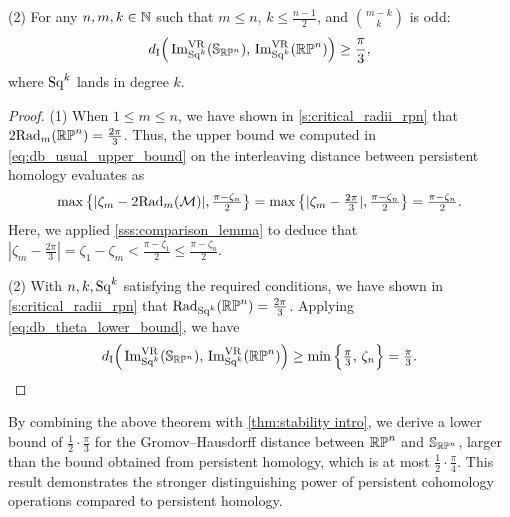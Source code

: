 \noindent (2) For any \(n,m,k \in \mathbb{N}\) such that \(m \leq n\), \(k \leq \tfrac{n-1}{2}\), and \(\binom{m-k}{k}\) is odd:
\[
d_{\mathrm{I}}\Big(\operatorname{Im}_{\mathrm{Sq}^k}^{\mathrm{VR}}(\mathbb{S}_{\mathbb{RP}^n}),\, \operatorname{Im}_{\mathrm{Sq}^k}^{\mathrm{VR}}(\mathbb{RP}^n)\Big) \geq \frac{\pi}{3},
\]
where $\mathrm{Sq}^k$ lands in degree \(k\).

\begin{proof}
	(1) When $1 \leq m \leq n$, we have shown in \cref{s:critical_radii_rpn} that
	$2\mathrm{Rad}_{m}(\mathbb{RP}^n) = \tfrac{2\pi}{3}$.
	Thus, the upper bound we computed in \cref{eq:db_usual_upper_bound} on the interleaving distance between persistent homology evaluates as
	\[\max\big\{|\zeta_m - 2\mathrm{Rad}_{m}(\mathcal{M}) |, \tfrac{\pi - \zeta_n}{2}\big\} =
	\max \big\{ |\zeta_m - \tfrac{2\pi}{3} |, \tfrac{\pi - \zeta_n}{2} \big\}
	= \tfrac{\pi - \zeta_n}{2}.
	\]
	Here, we applied \cref{sss:comparison_lemma} to deduce that $|\zeta_m - \tfrac{2\pi}{3} | = \zeta_1 - \zeta_m < \tfrac{\pi - \zeta_1}{2} \leq \tfrac{\pi - \zeta_n}{2}$.

	(2) With $n,k,\mathrm{Sq}^k$ satisfying the required conditions, we have shown in \cref{s:critical_radii_rpn} that
	$\mathrm{Rad}_{\mathrm{Sq}^k}(\mathbb{RP}^n) = \tfrac{2\pi}{3}$.
	Applying \cref{eq:db_theta_lower_bound}, we have
	\[d_{\mathrm{I}}\Big(\operatorname{Im}_{\mathrm{Sq}^k}^{\mathrm{VR}}(\mathbb{S}_{\mathbb{RP}^n}),\, \operatorname{Im}_{\mathrm{Sq}^k}^{\mathrm{VR}}(\mathbb{RP}^n)\Big)
	\geq \min\Big\{\tfrac{\pi}{3},\, \zeta_n\Big\}
	= \tfrac{\pi}{3}.\qedhere
	\]
\end{proof}

By combining the above theorem with \cref{thm:stability intro}, we derive a lower bound of \(\frac{1}{2} \cdot \frac{\pi}{3}\) for the Gromov–Hausdorff distance between \(\mathbb{RP}^n\) and \(\mathbb{S}_{\mathbb{RP}^n}\), larger than the bound obtained from persistent homology, which is at most \(\frac{1}{2} \cdot \frac{\pi}{4}\).
This result demonstrates the stronger distinguishing power of persistent cohomology operations compared to persistent homology.